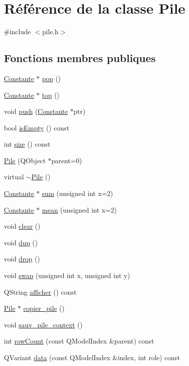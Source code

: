 \hypertarget{class_pile}{\section{\-Référence de la classe \-Pile}
\label{class_pile}
}


{\ttfamily \#include $<$pile.\-h$>$}

\subsection*{\-Fonctions membres publiques}
\begin{DoxyCompactItemize}
\item 
\hyperlink{class_constante}{\-Constante} $\ast$ \hyperlink{class_pile_a2bbdc329f485cd017f8cbf88456ae68a}{pop} ()
\item 
\hyperlink{class_constante}{\-Constante} $\ast$ \hyperlink{class_pile_a25c322d47a76d758565bdf9df2253411}{top} ()
\item 
void \hyperlink{class_pile_a18a4d9a9b8013b36a5423817f9fb9049}{push} (\hyperlink{class_constante}{\-Constante} $\ast$ptr)
\item 
bool \hyperlink{class_pile_ae45e55f151180284728643cb9cfe4095}{is\-Empty} () const 
\item 
int \hyperlink{class_pile_aaae1107e877f7094bdbd97839c731634}{size} () const 
\item 
\hyperlink{class_pile_a07d95a908492bd45d1ac105aa78f9dcd}{\-Pile} (\-Q\-Object $\ast$parent=0)
\item 
virtual \hyperlink{class_pile_ab2d1398d675586ff34994e2b109df152}{$\sim$\-Pile} ()
\item 
\hyperlink{class_constante}{\-Constante} $\ast$ \hyperlink{class_pile_a91875101e0976f054d1db8869a00b11d}{sum} (unsigned int x=2)
\item 
\hyperlink{class_constante}{\-Constante} $\ast$ \hyperlink{class_pile_a312bdfd2e167615c8d7f11adb2e639ed}{mean} (unsigned int x=2)
\item 
void \hyperlink{class_pile_aa3991438f190580607d7bbbd50ecc0c3}{clear} ()
\item 
void \hyperlink{class_pile_a081f7843d01cae1f0f7be7d92e46d5d2}{dup} ()
\item 
void \hyperlink{class_pile_a7488ed257c6ceb16ed57a9fffb0726d5}{drop} ()
\item 
void \hyperlink{class_pile_ab6c3f9840427e2be87e0d76c8697fff5}{swap} (unsigned int x, unsigned int y)
\item 
\-Q\-String \hyperlink{class_pile_a4964563804a254503d6413e5ba83d3c5}{afficher} () const 
\item 
\hyperlink{class_pile}{\-Pile} $\ast$ \hyperlink{class_pile_a4be384a2c00fff0afed507231a2974dc}{copier\-\_\-pile} ()
\item 
void \hyperlink{class_pile_a380c3a467b58c175aef4f2cdc0f7a2c7}{sauv\-\_\-pile\-\_\-context} ()
\item 
int \hyperlink{class_pile_a44545327a8d02ad9775a2c918ea5cdfc}{row\-Count} (const \-Q\-Model\-Index \&parent) const 
\item 
\-Q\-Variant \hyperlink{class_pile_ac9d6e388d3a98eb57a786f9bbec30952}{data} (const \-Q\-Model\-Index \&index, int role) const 
\end{DoxyCompactItemize}
